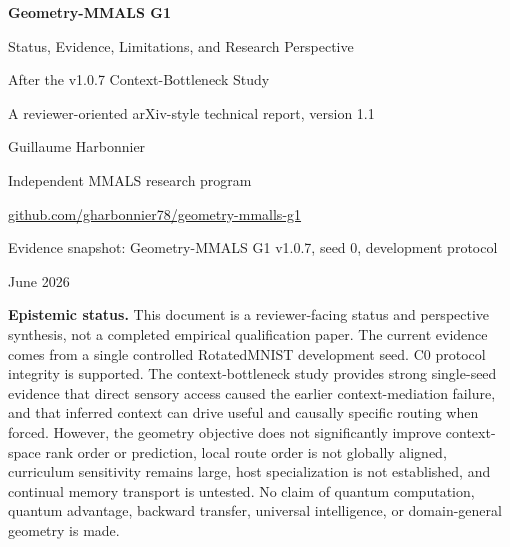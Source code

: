 \documentclass[11pt,a4paper]{article}
\begin{document}
\begin{titlepage}
\centering
\vspace*{0.9cm}
{\Huge\bfseries\color{deepblue} Geometry-MMALS G1\par}
\vspace{0.25cm}
{\LARGE Status, Evidence, Limitations, and Research Perspective\par}
\vspace{0.3cm}
{\Large After the v1.0.7 Context-Bottleneck Study\par}
\vspace{0.45cm}
{\large A reviewer-oriented arXiv-style technical report, version 1.1\par}
\vspace{1.0cm}
{\Large Guillaume Harbonnier\par}
\vspace{0.2cm}
{\normalsize Independent MMALS research program\par}
\vspace{0.15cm}
{\normalsize \href{https://github.com/gharbonnier78/geometry-mmalls-g1}{github.com/gharbonnier78/geometry-mmalls-g1}\par}
\vspace{0.7cm}
{\normalsize Evidence snapshot: Geometry-MMALS G1 v1.0.7, seed 0, development protocol\par}
{\normalsize June 2026\par}
\vfill
\begin{minipage}{0.92\textwidth}
\small
\textbf{Epistemic status.} This document is a reviewer-facing status and perspective synthesis, not a completed empirical qualification paper. The current evidence comes from a single controlled RotatedMNIST development seed. C0 protocol integrity is supported. The context-bottleneck study provides strong single-seed evidence that direct sensory access caused the earlier context-mediation failure, and that inferred context can drive useful and causally specific routing when forced. However, the geometry objective does not significantly improve context-space rank order or prediction, local route order is not globally aligned, curriculum sensitivity remains large, host specialization is not established, and continual memory transport is untested. No claim of quantum computation, quantum advantage, backward transfer, universal intelligence, or domain-general geometry is made.
\end{minipage}
\vfill
\end{titlepage}
\end{document}
